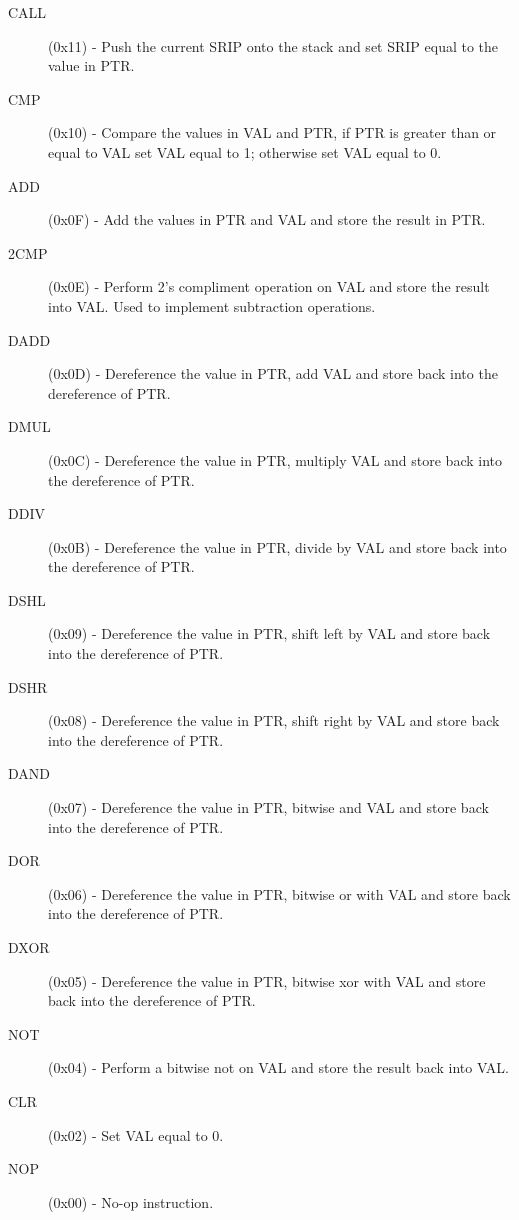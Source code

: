 \begin{description}
\item[CALL] (0x11) - 
Push the current SRIP onto the stack and set SRIP equal to the value in PTR.

\item[CMP] (0x10) - 
Compare the values in VAL and PTR, if PTR is greater than or equal to VAL
set VAL equal to 1; otherwise set VAL equal to 0. 

\item[ADD] (0x0F) - 
Add the values in PTR and VAL and store the result in PTR.

\item[2CMP] (0x0E) - 
Perform 2's compliment operation on VAL and store the result into VAL.
Used to implement subtraction operations.

\item[DADD] (0x0D) - 
Dereference the value in PTR, add VAL and store back into the dereference 
of PTR. 

\item[DMUL] (0x0C) - 
Dereference the value in PTR, multiply VAL and store back into the dereference
 of PTR. 

\item[DDIV] (0x0B) - 
Dereference the value in PTR, divide by VAL and store back into the 
dereference of PTR. 

\item[DSHL] (0x09) - 
Dereference the value in PTR, shift left by VAL and store back into the 
dereference of PTR. 

\item[DSHR] (0x08) - 
Dereference the value in PTR, shift right by VAL and store back into the 
dereference of PTR. 

\item[DAND] (0x07) - 
Dereference the value in PTR, bitwise and VAL and store back into the 
dereference of PTR. 

\item[DOR] (0x06) - 
Dereference the value in PTR, bitwise or with VAL and store back into the 
dereference of PTR. 

\item[DXOR] (0x05) - 
Dereference the value in PTR, bitwise xor with VAL and store back into the 
dereference of PTR. 

\item[NOT] (0x04) - 
Perform a bitwise not on VAL and store the result back into VAL. 

\item[CLR] (0x02) - 
Set VAL equal to 0. 

\item[NOP] (0x00) - 
No-op instruction.
\end{description}


